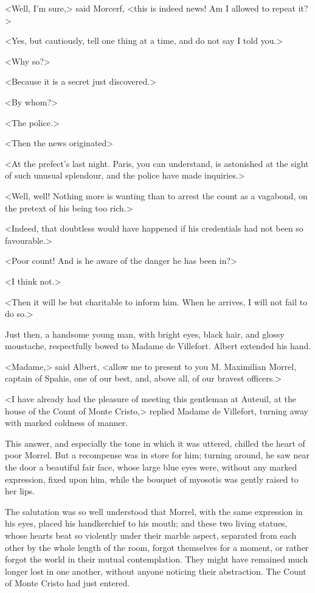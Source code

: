  <Well, I'm sure,> said Morcerf, <this is indeed news! Am I allowed to repeat it?> 

 <Yes, but cautiously, tell one thing at a time, and do not say I told you.> 

 <Why so?> 

 <Because it is a secret just discovered.> 

 <By whom?> 

 <The police.> 

 <Then the news originated\longdash> 

 <At the prefect's last night. Paris, you can understand, is astonished at the sight of such unusual splendour, and the police have made inquiries.> 

 <Well, well! Nothing more is wanting than to arrest the count as a vagabond, on the pretext of his being too rich.> 

 <Indeed, that doubtless would have happened if his credentials had not been so favourable.> 

 <Poor count! And is he aware of the danger he has been in?> 

 <I think not.> 

 <Then it will be but charitable to inform him. When he arrives, I will not fail to do so.> 

 Just then, a handsome young man, with bright eyes, black hair, and glossy moustache, respectfully bowed to Madame de Villefort. Albert extended his hand. 

 <Madame,> said Albert, <allow me to present to you M. Maximilian Morrel, captain of Spahis, one of our best, and, above all, of our bravest officers.> 

 <I have already had the pleasure of meeting this gentleman at Auteuil, at the house of the Count of Monte Cristo,> replied Madame de Villefort, turning away with marked coldness of manner. 

 This answer, and especially the tone in which it was uttered, chilled the heart of poor Morrel. But a recompense was in store for him; turning around, he saw near the door a beautiful fair face, whose large blue eyes were, without any marked expression, fixed upon him, while the bouquet of myosotis was gently raised to her lips. 

 The salutation was so well understood that Morrel, with the same expression in his eyes, placed his handkerchief to his mouth; and these two living statues, whose hearts beat so violently under their marble aspect, separated from each other by the whole length of the room, forgot themselves for a moment, or rather forgot the world in their mutual contemplation. They might have remained much longer lost in one another, without anyone noticing their abstraction. The Count of Monte Cristo had just entered. 

